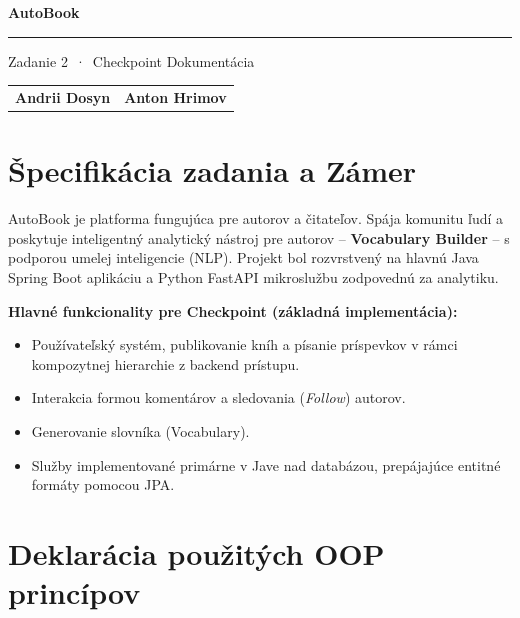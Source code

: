 \documentclass[12pt,a4paper]{article}
\begin{document}
\begin{titlepage}
\centering

\vspace*{3cm}

{\Huge\textbf{AutoBook}}

\vspace{0.4cm}
\rule{8cm}{0.8pt}
\vspace{0.4cm}

{\large Zadanie 2~·~Checkpoint Dokumentácia}


\vspace{3cm}

\begin{tabular}{cc}
\centering\large\textbf{Andrii Dosyn} & \centering\large\textbf{Anton Hrimov}
\end{tabular}

\vspace{3cm}

\end{titlepage}

\tableofcontents
\newpage

\section{Špecifikácia zadania a Zámer}

AutoBook je platforma fungujúca pre autorov a čitateľov. Spája komunitu ľudí a poskytuje inteligentný analytický nástroj pre autorov -- \textbf{Vocabulary Builder} -- s podporou umelej inteligencie (NLP). Projekt bol rozvrstvený na hlavnú Java Spring Boot aplikáciu a Python FastAPI mikroslužbu zodpovednú za analytiku.

\textbf{Hlavné funkcionality pre Checkpoint (základná implementácia):}
\begin{itemize}
    \item Používateľský systém, publikovanie kníh a písanie príspevkov v rámci kompozytnej hierarchie z backend prístupu.
    \item Interakcia formou komentárov a sledovania (\textit{Follow}) autorov.
    \item Generovanie slovníka (Vocabulary).
    \item Služby implementované primárne v Jave nad databázou, prepájajúce entitné formáty pomocou JPA.
\end{itemize}

\section{Deklarácia použitých OOP princípov}
\end{document}
